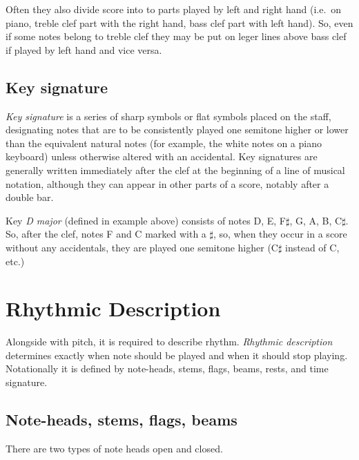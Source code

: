 \figcenter{}

Often they also divide score into to parts played by left and right hand (i.e.\ on piano, treble clef part with
the right hand, bass clef part with left hand). So, even if some notes belong to treble clef they may be put on leger
lines above bass clef if played by left hand and vice versa.

\figcenter{}


\subsection{Key signature}\label{subsec:key-signature}
\textit{Key signature} is a series of sharp symbols or flat symbols placed on the staff, designating notes that are to
be consistently played one semitone higher or lower than the equivalent natural notes (for example, the white notes on
a piano keyboard) unless otherwise altered with an accidental. Key signatures are generally written immediately after
the clef at the beginning of a line of musical notation, although they can appear in other parts of a score, notably
after a double bar\cite{key-signature}.

\figcenter{}

Key \textit{D major} (defined in example above) consists of notes D, E, F$\sharp$, G, A, B,
C$\sharp$. So, after the clef, notes F and C marked with a $\sharp$, so, when they occur in
a score without any accidentals, they are played one semitone higher (C$\sharp$ instead of C, etc.)


\section{Rhythmic Description}\label{sec:rhythmic-description}
Alongside with pitch, it is required to describe rhythm. \textit{Rhythmic description} determines exactly when note
should be played and when it should stop playing. Notationally it is defined by note-heads, stems, flags, beams, rests,
and time signature.

\subsection{Note-heads, stems, flags, beams}\label{subsec:note-heads}

There are two types of note heads open and closed.
\figcenter{}

